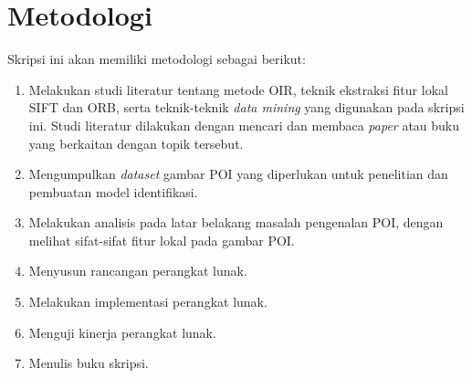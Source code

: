 \section{Metodologi}
\label{sec:metlit}
Skripsi ini akan memiliki metodologi sebagai berikut:
\begin{enumerate}
	\item Melakukan studi literatur tentang metode OIR, teknik ekstraksi fitur lokal SIFT dan ORB, serta teknik-teknik \textit{data mining} yang digunakan pada skripsi ini. Studi literatur dilakukan dengan mencari dan membaca \textit{paper} atau buku yang berkaitan dengan topik tersebut.
	\item Mengumpulkan \textit{dataset} gambar POI yang diperlukan untuk penelitian dan pembuatan model identifikasi.
	\item Melakukan analisis pada latar belakang masalah pengenalan POI, dengan melihat sifat-sifat fitur lokal pada gambar POI.
	\item Menyusun rancangan perangkat lunak.
	\item Melakukan implementasi perangkat lunak.
	\item Menguji kinerja perangkat lunak.
	\item Menulis buku skripsi.
\end{enumerate}

